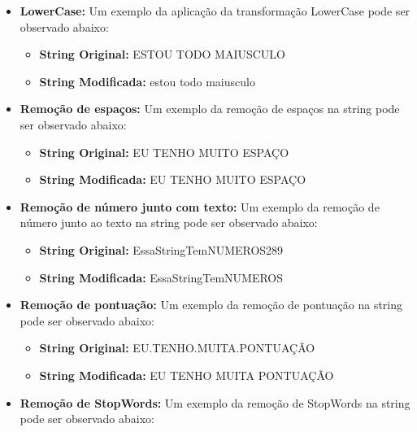 \documentclass[conference]{IEEEtran}
\begin{document}
		\begin{itemize}
			\item \textbf{LowerCase:} Um exemplo da aplicação da transformação LowerCase pode ser observado abaixo:
			\begin{itemize}
				\item \textbf{String Original:}  ESTOU TODO MAIUSCULO
				\item \textbf{String Modificada:}  estou todo maiusculo
			\end{itemize}

			\vspace{0.2cm}
			\item \textbf{Remoção de espaços:} Um exemplo da remoção de espaços na string pode ser observado abaixo:

			\begin{itemize}
				\item \textbf{String Original:} EU    TENHO     MUITO     ESPAÇO
				\item \textbf{String Modificada:} EU TENHO MUITO ESPAÇO
			\end{itemize}
			
			\vspace{0.2cm}
			\item \textbf{Remoção de número junto com texto:} Um exemplo da remoção de número junto ao texto na string pode ser observado abaixo:

			\begin{itemize}
				\item \textbf{String Original:} EssaStringTemNUMEROS289
				\item \textbf{String Modificada:} EssaStringTemNUMEROS
			\end{itemize}
		
			\vspace{0.2cm}
			\item \textbf{Remoção de pontuação: } Um exemplo da remoção de pontuação na string pode ser observado abaixo:
			
			\begin{itemize}
				\item \textbf{String Original:} EU.TENHO.MUITA.PONTUAÇÃO
				\item \textbf{String Modificada:} EU TENHO MUITA PONTUAÇÃO
			\end{itemize}
			
			\vspace{0.2cm}
			\item \textbf{Remoção de StopWords:} Um exemplo da remoção de StopWords na string pode ser observado abaixo:
			

\end{itemize}
\end{document}
